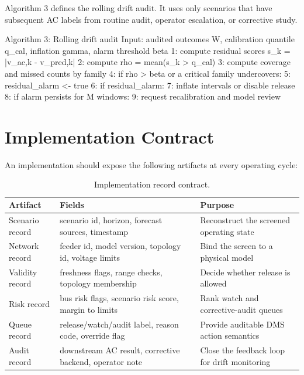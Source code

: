 \documentclass[
  preprint,12pt]{elsarticle}
\newenvironment{Shaded}{}{}
\newcommand{\NormalTok}[1]{#1}
\begin{document}
Algorithm 3 defines the rolling drift audit. It uses only scenarios that
have subsequent AC labels from routine audit, operator escalation, or
corrective study.

\begin{Shaded}
\begin{Highlighting}[]
\NormalTok{Algorithm 3: Rolling drift audit}
\NormalTok{Input: audited outcomes W, calibration quantile q\_cal,}
\NormalTok{       inflation gamma, alarm threshold beta}
\NormalTok{1: compute residual scores s\_k = |v\_ac,k {-} v\_pred,k|}
\NormalTok{2: compute rho = mean(s\_k \textgreater{} q\_cal)}
\NormalTok{3: compute coverage and missed counts by family}
\NormalTok{4: if rho \textgreater{} beta or a critical family undercovers:}
\NormalTok{5:     residual\_alarm \textless{}{-} true}
\NormalTok{6: if residual\_alarm:}
\NormalTok{7:     inflate intervals or disable release}
\NormalTok{8: if alarm persists for M windows:}
\NormalTok{9:     request recalibration and model review}
\end{Highlighting}
\end{Shaded}

\section{Implementation Contract}\label{implementation-contract}

An implementation should expose the following artifacts at every
operating cycle:

\begin{longtable}[]{@{}
  >{\centering\hyphenpenalty=10000\exhyphenpenalty=10000\arraybackslash}m{}
  >{\centering\hyphenpenalty=10000\exhyphenpenalty=10000\arraybackslash}m{}
  >{\centering\hyphenpenalty=10000\exhyphenpenalty=10000\arraybackslash}m{}@{}}
\caption{Implementation record contract.}\\\toprule\noalign{}
Artifact & Fields & Purpose \\
\midrule\noalign{}
\endhead
\bottomrule\noalign{}
\endlastfoot
Scenario record & scenario id, horizon, forecast sources, timestamp &
Reconstruct the screened operating state \\
Network record & feeder id, model version, topology id, voltage limits &
Bind the screen to a physical model \\
Validity record & freshness flags, range checks, topology membership &
Decide whether release is allowed \\
Risk record & bus risk flags, scenario risk score, margin to limits &
Rank watch and corrective-audit queues \\
Queue record & release/watch/audit label, reason code, override flag &
Provide auditable DMS action semantics \\
Audit record & downstream AC result, corrective backend, operator note &
Close the feedback loop for drift monitoring \\
\end{longtable}
\end{document}

